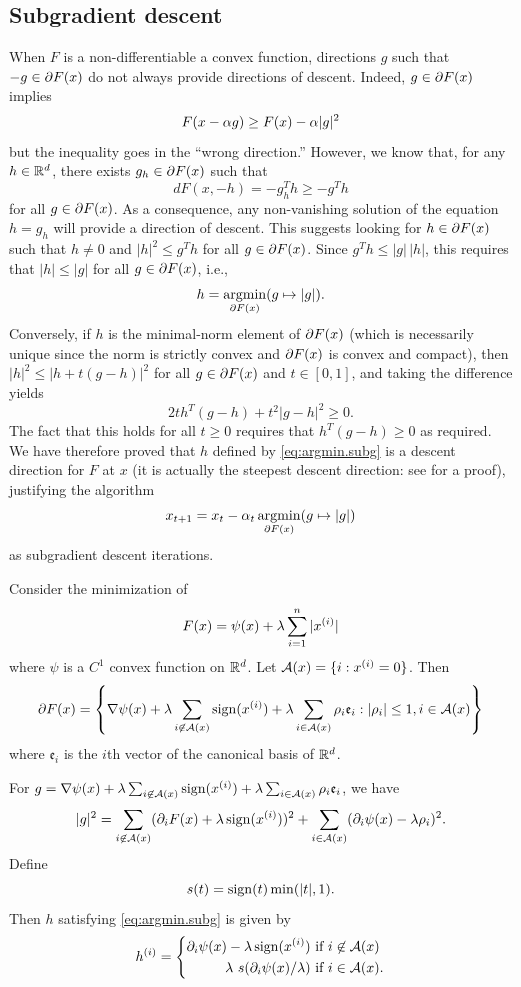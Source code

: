 \subsection{Subgradient descent}
\label{sec:subg.descent}
When $F$ is a non-differentiable a convex function, directions $g$ such that $-g\in \partial F(x)$ do not always provide directions of descent. Indeed, $g\in\partial F(x)$ implies
\[
F(x-\alpha g) \geq F(x) - \alpha |g|^2
\]
but the inequality goes in the ``wrong direction.''  However, we know that, for any $h\in {\mathbb{R}}^d$, there exists $g_h\in \partial F(x)$ such that 
\[
dF(x, -h) = -g_h^T h \geq -g^T h
\]
for all $g \in \partial F(x)$. As a consequence, any non-vanishing solution of the equation $h = g_h$ will provide a direction of descent. This suggests looking for $h\in \partial F(x)$ such that $h\neq 0$ and $|h|^2 \leq g^Th$ for all $g\in \partial F(x)$. Since $g^T h \leq |g|\, |h|$, this requires that $|h| \leq |g|$ for all $g\in \partial F(x)$, i.e., 
\begin{equation}
\label{eq:argmin.subg}
h = \operatorname*{argmin}_{\partial F(x)} (g\mapsto |g|).
\end{equation}
Conversely, if $h$ is the minimal-norm element of $\partial F(x)$ (which is necessarily unique since the norm is strictly convex and $\partial F(x)$ is convex and compact), then $|h|^2 \leq |h + t(g-h)|^2$ for all $g\in \partial F(x)$ and $t\in [0,1]$, and taking the difference yields
\[
2t h^T(g-h) + t^2 |g-h|^2 \geq 0.
\]
The fact that this holds for all $t\geq 0$ requires that $h^T(g-h) \geq 0$ as required. We have therefore proved that $h$ defined by \cref{eq:argmin.subg} is a descent direction for $F$ at $x$ (it is actually the steepest descent direction: see \citep{wright2022optimization} for a proof), justifying the algorithm
\[
x_{t+1} = x_t - \alpha_t \operatorname*{argmin}_{\partial F(x)} (g\mapsto |g|)
\]
as subgradient descent iterations. 

Consider the minimization of
\[
F(x) = \psi(x) + \lambda \sum_{i=1}^n |x^{(i)}|
\]
where $\psi$ is a $C^1$ convex function on ${\mathbb{R}}^d$.
Let ${\mathcal A}(x) = \{i: x^{(i)} = 0\}$. Then
\[
\partial F(x) = \left\{\nabla \psi(x) + \lambda  \sum_{i\not\in {\mathcal A}(x)}\operatorname{sign}(x^{(i)}) + \lambda \sum_{i\in {\mathcal A}(x)} \rho_i \mathfrak e_i: |\rho_i|\leq 1, i\in {\mathcal A}(x)\right\}
\]
where $\mathfrak e_i$ is the $i$th vector of the canonical basis of ${\mathbb{R}}^d$.

For $g = \nabla \psi(x) +  \lambda  \sum_{i\not\in {\mathcal A}(x)}\operatorname{sign}(x^{(i)}) + \lambda \sum_{i\in {\mathcal A}(x)} \rho_i \mathfrak e_i$, we have
\[
|g|^2 = \sum_{i\not\in {\mathcal A}(x)} ( \partial_i F(x)+\lambda \operatorname{sign}(x^{(i)}))^2 + \sum_{i\in {\mathcal A}(x)} (\partial_i \psi(x) - \lambda\rho_i)^2.
\]
Define 
\[
s(t) = \operatorname{sign}(t) \min(|t|, 1).
\]
Then $h$ satisfying \cref{eq:argmin.subg} is given by
\[
h^{(i)} = \left\{
\begin{aligned}
\partial_i \psi(x) - \lambda \operatorname{sign}(x^{(i)}) & \text{ if } i\not\in {\mathcal A}(x) \\
\lambda \  s(\partial_i \psi(x)/\lambda) & \text{ if } i\in {\mathcal A}(x) .
\end{aligned}
\right.
\]


